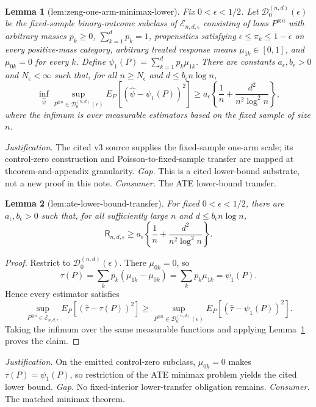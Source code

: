 \documentclass{article}
\newtheorem{lemma}{Lemma}
\begin{document}
\begin{lemma}[lem:zeng-one-arm-minimax-lower]\label{lem:zeng-one-arm-minimax-lower}
Fix \(0<\epsilon<1/2\). Let \(\mathcal D_0^{(n,d)}(\epsilon)\) be the fixed-sample binary-outcome subclass of \(\mathcal E_{n,d,\epsilon}\) consisting of laws \(P^{\otimes n}\) with arbitrary masses \(p_k\ge0\), \(\sum_{k=1}^d p_k=1\), propensities satisfying \(\epsilon\le\pi_k\le1-\epsilon\) on every positive-mass category, arbitrary treated response means \(\mu_{1k}\in[0,1]\), and \(\mu_{0k}=0\) for every \(k\). Define \(\psi_1(P)=\sum_{k=1}^d p_k\mu_{1k}\). There are constants \(a_\epsilon,b_\epsilon>0\) and \(N_\epsilon<\infty\) such that, for all \(n\ge N_\epsilon\) and \(d\le b_\epsilon n\log n\),
\[
\inf_{\widehat\psi}\sup_{P^{\otimes n}\in\mathcal D_0^{(n,d)}(\epsilon)}E_P[(\widehat\psi-\psi_1(P))^2]\ge a_\epsilon\left\{\frac1n+\frac{d^2}{n^2\log^2n}\right\},
\]
where the infimum is over measurable estimators based on the fixed sample of size \(n\).
\end{lemma}
\par\smallskip\noindent \textit{Justification.} The cited v3 source supplies the fixed-sample one-arm scale; its control-zero construction and Poisson-to-fixed-sample transfer are mapped at theorem-and-appendix granularity. \textit{Gap.} This is a cited lower-bound substrate, not a new proof in this note. \textit{Consumer.} The ATE lower-bound transfer.

\begin{lemma}[lem:ate-lower-bound-transfer]\label{lem:ate-lower-bound-transfer}
For fixed \(0<\epsilon<1/2\), there are \(a_\epsilon,b_\epsilon>0\) such that, for all sufficiently large \(n\) and \(d\le b_\epsilon n\log n\),
\[
\mathsf R_{n,d,\epsilon}\ge a_\epsilon\left\{\frac1n+\frac{d^2}{n^2\log^2n}\right\}.
\]
\end{lemma}
\begin{proof}
Restrict to \(\mathcal D_0^{(n,d)}(\epsilon)\). There \(\mu_{0k}=0\), so
\[
\tau(P)=\sum_kp_k(\mu_{1k}-\mu_{0k})=\sum_kp_k\mu_{1k}=\psi_1(P).
\tag{1}
\]
Hence every estimator satisfies
\[
\sup_{P^{\otimes n}\in\mathcal E_{n,d,\epsilon}}E_P[(\widehat\tau-\tau(P))^2]\ge\sup_{P^{\otimes n}\in\mathcal D_0^{(n,d)}(\epsilon)}E_P[(\widehat\tau-\psi_1(P))^2].
\tag{2}
\]
Taking the infimum over the same measurable functions and applying Lemma~\ref{lem:zeng-one-arm-minimax-lower} proves the claim.
\end{proof}
\par\smallskip\noindent \textit{Justification.} On the emitted control-zero subclass, \(\mu_{0k}=0\) makes \(\tau(P)=\psi_1(P)\), so restriction of the ATE minimax problem yields the cited lower bound. \textit{Gap.} No fixed-interior lower-transfer obligation remains. \textit{Consumer.} The matched minimax theorem.
\end{document}
